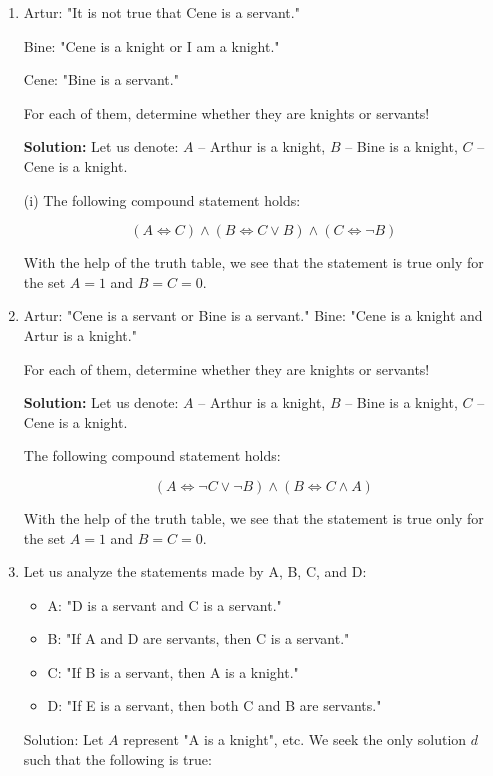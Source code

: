 \documentclass[11pt,paper=b5,footinclude,headinclude]{scrbook} %
\theoremstyle{remark}
\theoremstyle{definition} %
\theoremstyle{theorem} %
\begin{document}
\begin{enumerate}[Problem 1.]

\item 
 Artur: "It is not true that Cene is a servant."
 
Bine: "Cene is a knight or I am a knight."

Cene: "Bine is a servant."

For each of them, determine whether they are knights or servants!

\textbf{Solution:}
Let us denote: $A$ – Arthur is a knight, $B$ – Bine is a knight, $C$ – Cene is a knight.

(i) The following compound statement holds:

\[
(A \iff C) \land (B \iff C \lor B) \land (C \iff \neg B)
\]

With the help of the truth table, we see that the statement is true only for the set $A = 1$ and $B = C = 0$.

\item Artur: "Cene is a servant or Bine is a servant."
Bine: "Cene is a knight and Artur is a knight."

For each of them, determine whether they are knights or servants!

\textbf{Solution:}
Let us denote: $A$ – Arthur is a knight, $B$ – Bine is a knight, $C$ – Cene is a knight.

The following compound statement holds:

\[
(A \iff \neg C \lor \neg B) \land (B \iff C \land A)
\]

With the help of the truth table, we see that the statement is true only for the set $A = 1$ and $B = C = 0$.

    \item Let us analyze the statements made by A, B, C, and D:

\begin{itemize}
    \item A: "D is a servant and C is a servant."
    \item B: "If A and D are servants, then C is a servant."
    \item C: "If B is a servant, then A is a knight."
    \item D: "If E is a servant, then both C and B are servants."
\end{itemize}

Solution: Let \( A \) represent "A is a knight", etc. We seek the only solution \( d \) such that the following is true:


\end{enumerate}
\end{document}
